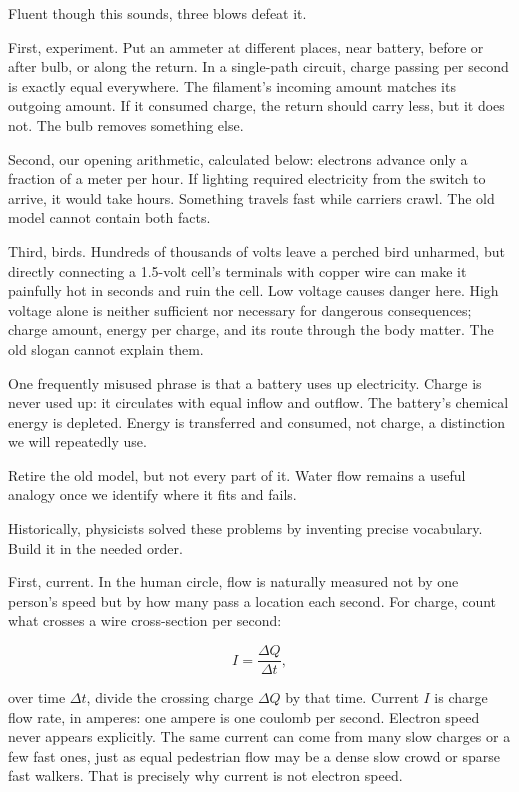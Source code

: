 Fluent though this sounds, three blows defeat it.

First, experiment. Put an ammeter at different places, near battery, before or after bulb, or along the return. In a single-path circuit, charge passing per second is exactly equal everywhere. The filament's incoming amount matches its outgoing amount. If it consumed charge, the return should carry less, but it does not. The bulb removes something else.

Second, our opening arithmetic, calculated below: electrons advance only a fraction of a meter per hour. If lighting required electricity from the switch to arrive, it would take hours. Something travels fast while carriers crawl. The old model cannot contain both facts.

Third, birds. Hundreds of thousands of volts leave a perched bird unharmed, but directly connecting a 1.5-volt cell's terminals with copper wire can make it painfully hot in seconds and ruin the cell. Low voltage causes danger here. High voltage alone is neither sufficient nor necessary for dangerous consequences; charge amount, energy per charge, and its route through the body matter. The old slogan cannot explain them.

One frequently misused phrase is that a battery uses up electricity. Charge is never used up: it circulates with equal inflow and outflow. The battery's chemical energy is depleted. Energy is transferred and consumed, not charge, a distinction we will repeatedly use.

Retire the old model, but not every part of it. Water flow remains a useful analogy once we identify where it fits and fails.


Historically, physicists solved these problems by inventing precise vocabulary. Build it in the needed order.

First, current. In the human circle, flow is naturally measured not by one person's speed but by how many pass a location each second. For charge, count what crosses a wire cross-section per second:

\[
I=\frac{\Delta Q}{\Delta t},
\]

over time \(\Delta t\), divide the crossing charge \(\Delta Q\) by that time. Current \(I\) is charge flow rate, in amperes: one ampere is one coulomb per second. Electron speed never appears explicitly. The same current can come from many slow charges or a few fast ones, just as equal pedestrian flow may be a dense slow crowd or sparse fast walkers. That is precisely why current is not electron speed.

